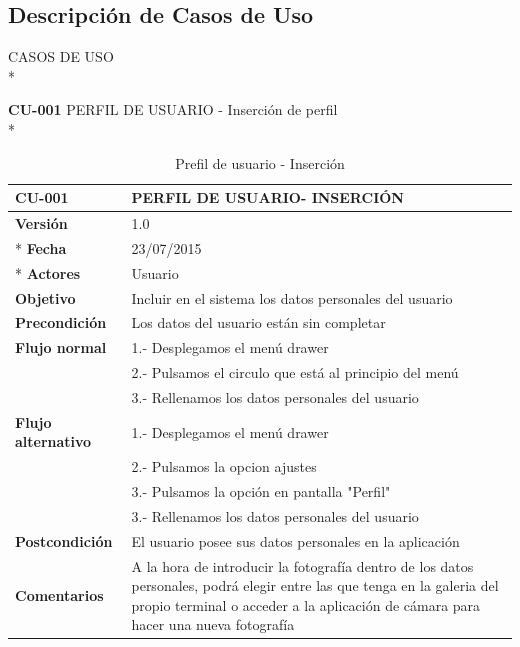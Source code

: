 \documentclass[../pfc.tex]{subfiles}
\begin{document}
	\subsection{Descripción de Casos de Uso}
	
	CASOS DE USO\\*
	
	\textbf{CU-001} PERFIL DE USUARIO - Inserción de perfil\\*
	
	\begin{table}[!hbt]
		\centering
		\begin{tabular}[t]{|p{3cm}|p{9.5cm}|}
				\hline \textbf{CU-001} & \textbf{PERFIL DE USUARIO- INSERCIÓN} \\*
				\hline\hline \textbf{Versión} & 1.0 \\ *
				\hline\hline \textbf{Fecha} & 23/07/2015 \\ *
				\hline\textbf{Actores} 	& Usuario\\*
				\hline \textbf{Objetivo} & Incluir en el sistema los datos personales del usuario\\* 			
				\hline \textbf{Precondición} & Los datos del usuario están sin completar \\* 
				\hline \textbf{Flujo normal} & 1.- Desplegamos el menú drawer \\* 
											 & 2.- Pulsamos el circulo que está al principio del menú \\*	
											 & 3.- Rellenamos los datos personales del usuario\\*	
				\hline \textbf{Flujo alternativo} & 1.- Desplegamos el menú drawer \\* 
 												  & 2.- Pulsamos la opcion ajustes \\*	
												  & 3.- Pulsamos la opción en pantalla "Perfil" \\*	
												  & 3.- Rellenamos los datos personales del usuario \\*	
				\hline \textbf{Postcondición} & El usuario posee sus datos personales en la aplicación \\* 
				\hline \textbf{Comentarios}   & A la hora de introducir la fotografía dentro de los datos personales, podrá elegir entre las que tenga en la galeria del propio terminal o acceder a la aplicación de cámara para hacer una nueva fotografía\\*
				\hline
			\end{tabular}
			\caption{Prefil de usuario - Inserción}
			\label{tabla:caso001}
	\end{table}
	
\end{document}
